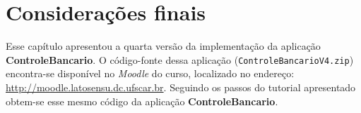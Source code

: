 \section{Considerações finais}

\vspace{0.3cm}


Esse  capítulo apresentou  a quarta  versão da  implementação da  aplicação {\bf
  ControleBancario}.         O        código-fonte        dessa        aplicação
({\footnotesize\texttt{ControleBancarioV4.zip}}) encontra-se  disponível no {\it
  Moodle}         do        curso,        localizado         no        endereço:
{\footnotesize\url{http://moodle.latosensu.dc.ufscar.br}}. Seguindo os passos do
tutorial   apresentado   obtem-se   esse   mesmo  código   da   aplicação   {\bf
  ControleBancario}.  


